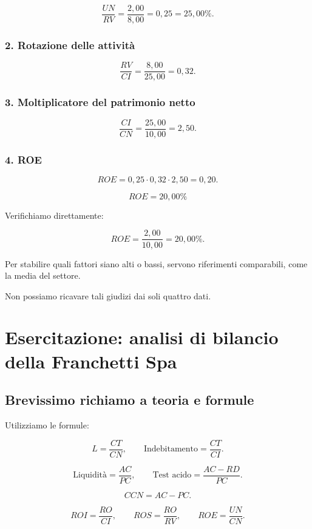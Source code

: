\[
\frac{UN}{RV}
=
\frac{2{,}00}{8{,}00}
=
0{,}25
=
\boxed{25{,}00\%}.
\]


\subsubsection*{2. Rotazione delle attività}

\[
\frac{RV}{CI}
=
\frac{8{,}00}{25{,}00}
=
\boxed{0{,}32}.
\]


\subsubsection*{3. Moltiplicatore del patrimonio netto}

\[
\frac{CI}{CN}
=
\frac{25{,}00}{10{,}00}
=
\boxed{2{,}50}.
\]


\subsubsection*{4. ROE}

\[
ROE=
0{,}25\cdot0{,}32\cdot2{,}50
=
0{,}20.
\]

\[
\boxed{ROE=20{,}00\%}
\]

\noindent Verifichiamo direttamente:

\[
ROE=
\frac{2{,}00}{10{,}00}
=
\boxed{20{,}00\%}.
\]

\noindent Per stabilire
quali fattori siano alti o bassi,
servono riferimenti comparabili,
come la media del settore.

\noindent Non possiamo ricavare
tali giudizi dai soli quattro dati.


\section{Esercitazione:
analisi di bilancio della Franchetti Spa}

\subsection*{Brevissimo richiamo a teoria e formule}

\noindent Utilizziamo le formule:

\[
L=\frac{CT}{CN},
\qquad
\text{Indebitamento}=\frac{CT}{CI}.
\]

\[
\text{Liquidità}=\frac{AC}{PC},
\qquad
\text{Test acido}=\frac{AC-RD}{PC}.
\]

\[
CCN=AC-PC.
\]

\[
ROI=\frac{RO}{CI},
\qquad
ROS=\frac{RO}{RV},
\qquad
ROE=\frac{UN}{CN}.
\]

